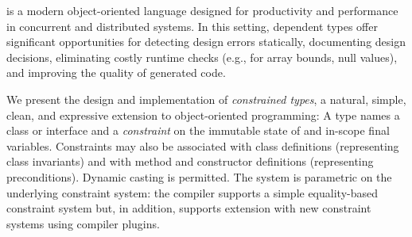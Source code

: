 \Xten{} is a modern object-oriented language designed for productivity and
performance in concurrent and distributed systems.  In this setting, dependent
types offer significant opportunities for detecting design errors statically,
documenting design decisions, eliminating costly runtime checks (e.g., for
array bounds, null values), and improving the quality of generated code.

We present the design and implementation of {\em constrained types}, a natural,
simple, clean, and expressive extension to object-oriented programming: A type
 names a class or interface  and a {\em constraint} 
on the immutable state of  and in-scope final variables.  Constraints
may also be associated with class definitions (representing class invariants)
and with method and constructor definitions (representing preconditions).
Dynamic casting is permitted.  The system is parametric on the underlying
constraint system: the compiler supports a simple equality-based constraint
system but, in addition, supports extension with new constraint systems using
compiler plugins.

